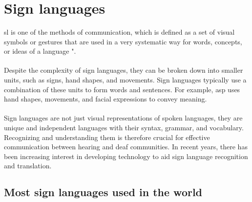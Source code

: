 \section{Sign languages}
\paragraph{}
\ac{sl} is one of the methods of communication, which is defined as a set of visual symbols or gestures that are used in a very systematic way for words, concepts, or ideas of a language "\cite{teaching}.
\paragraph{}
Despite the complexity of sign languages, they can be broken down into smaller units, such as signs, hand shapes, and movements. Sign languages typically use a combination of these units to form words and sentences. For example, \ac{asp} uses hand shapes, movements, and facial expressions to convey meaning.
\paragraph{}
Sign languages are not just visual representations of spoken languages, they are unique and independent languages with their syntax, grammar, and vocabulary. Recognizing and understanding them is therefore crucial for effective communication between hearing and deaf communities. In recent years, there has been increasing interest in developing technology to aid sign language recognition and translation.
\subsection{Most sign languages used in the world}
